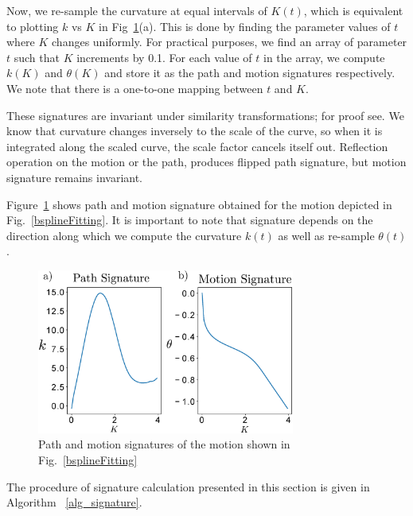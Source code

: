\documentclass[twocolumn,10pt]{asme2ej}
\begin{document}
Now, we re-sample the curvature at equal intervals of $K(t)$, which is equivalent to plotting $k$ vs $K$ in Fig~\ref{signature}(a).
This is done by finding the parameter values of $t$ where $K$ changes uniformly.
For practical purposes, we find an array of parameter $t$ such that $K$ increments by 0.1.
For each value of $t$ in the array, we compute $k(K)$ and $\theta(K)$ and store it as the path and motion signatures respectively. We note that there is a one-to-one mapping between $t$ and $K$.

These signatures are invariant under similarity transformations; for proof see\cite{cui2009}.
We know that curvature changes inversely to the scale of the curve, so when it is integrated along the scaled curve, the scale factor cancels itself out. Reflection operation on the motion or the path, produces flipped path signature, but motion signature remains invariant.

Figure~\ref{signature} shows path and motion signature obtained for the motion depicted in Fig.~\ref{bsplineFitting}. It is important to note that signature depends on the direction along which we compute the curvature $k(t)$ as well as re-sample $\theta(t)$.

\begin{figure}
\centering
\includegraphics[width=240pt]{figure/fig_signatures.eps}
  \caption{Path and motion signatures of the motion shown in Fig.~\ref{bsplineFitting}}
\label{signature}
\end{figure}

The procedure of signature calculation presented in this section is given in Algorithm ~\ref{alg_signature}.
\end{document}

